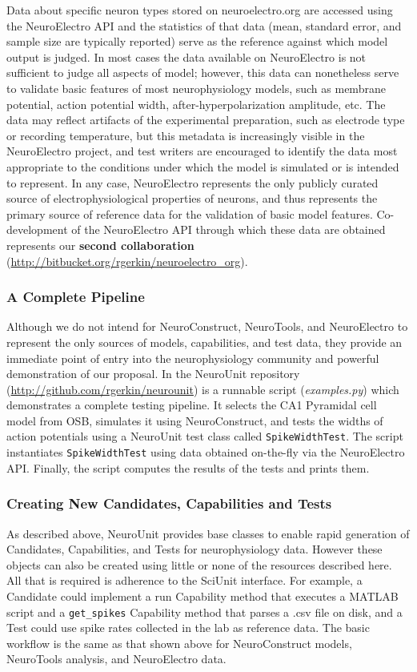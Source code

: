 \documentclass[11pt,letterpaper]{article}
\begin{document}
Data about specific neuron types stored on neuroelectro.org are accessed using the NeuroElectro API and the statistics of that data (mean, standard error, and sample size are typically reported) serve as the reference against which model output is judged.  In most cases the data available on NeuroElectro is not sufficient to judge all aspects of model; however, this data can nonetheless serve to validate basic features of most neurophysiology models, such as membrane potential, action potential width, after-hyperpolarization amplitude, etc.  The data may reflect artifacts of the experimental preparation, such as electrode type or recording temperature, but this metadata is increasingly visible in the NeuroElectro project, and test writers are encouraged to identify the data most appropriate to the conditions under which the model is simulated or is intended to represent.  In any case, NeuroElectro represents the only publicly curated source of electrophysiological properties of neurons, and thus represents the primary source of reference data for the validation of basic model features.  Co-development of the NeuroElectro API through which these data are obtained represents our \textbf{second collaboration} (\url{http://bitbucket.org/rgerkin/neuroelectro_org}).  

\subsubsection{A Complete Pipeline}
Although we do not intend for NeuroConstruct, NeuroTools, and NeuroElectro to represent the only sources of models, capabilities, and test data, they provide an immediate point of entry into the neurophysiology community and powerful demonstration of our proposal.  In the NeuroUnit repository (\url{http://github.com/rgerkin/neurounit}) is a runnable script (\textit{examples.py}) which demonstrates a complete testing pipeline.  It selects the CA1 Pyramidal cell model from OSB, simulates it using NeuroConstruct, and tests the widths of action potentials using a NeuroUnit test class called \verb|SpikeWidthTest|.  The script instantiates \verb|SpikeWidthTest| using data obtained on-the-fly via the NeuroElectro API.  Finally, the script computes the results of the tests and prints them.    

\subsubsection{Creating New Candidates, Capabilities and Tests}
As described above, NeuroUnit provides base classes to enable rapid generation of Candidates, Capabilities, and Tests for neurophysiology data.  However these objects can also be created using little or none of the resources described here.  All that is required is adherence to the SciUnit interface.  For example, a Candidate could implement a run Capability method that executes a MATLAB script and a \verb|get_spikes| Capability method that parses a .csv file on disk, and a Test could use spike rates collected in the lab as reference data. The basic workflow is the same as that shown above for NeuroConstruct models, NeuroTools analysis, and NeuroElectro data. 
\end{document}
